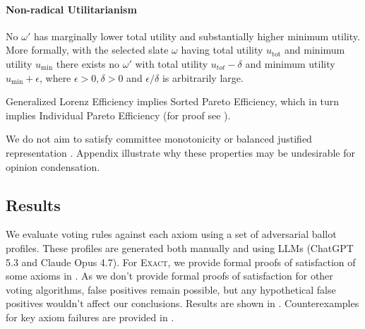 \documentclass[11pt]{article}
\newcommand{\Exact}{\textsc{Exact}}
\begin{document}
\paragraph{Non-radical Utilitarianism}
No $\omega'$ has marginally lower total utility and substantially higher minimum utility. More formally, with the selected slate $\omega$ having total utility $u_{\mathrm{tot}}$ and minimum utility $u_{\mathrm{min}}$ there exists no $\omega'$ with total utility $u_{tot} - \delta$ and minimum utility $u_{\mathrm{min}} + \epsilon$, where $\epsilon > 0, \delta > 0$ and $\epsilon/\delta$ is arbitrarily large.


Generalized Lorenz Efficiency implies Sorted Pareto Efficiency, which in turn implies Individual Pareto Efficiency (for proof see ). 

We do not aim to satisfy committee monotonicity \citep{elkind-committee-monotonicity} or balanced justified representation \citep{fish-v2}. Appendix  illustrate why these properties may be undesirable for opinion condensation.

\subsection{Results}
\label{sec:voting-results}

We evaluate voting rules against each axiom using a set of adversarial ballot profiles. These profiles are generated both manually and using LLMs (ChatGPT 5.3 and Claude Opus 4.7).
For \Exact{}, we provide formal proofs of satisfaction of some axioms in .
As we don't provide formal proofs of satisfaction for other voting algorithms, false positives remain possible, but any hypothetical false positives wouldn't affect our conclusions. Results are shown in . %
Counterexamples for key axiom failures are provided in .
\end{document}
